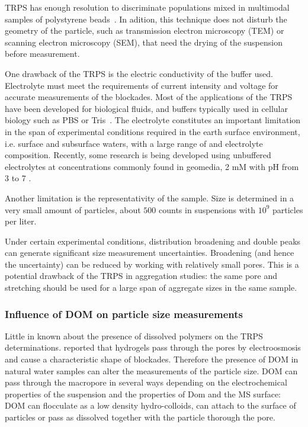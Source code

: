 \documentclass[journal=langd5,manuscript=article]{achemso}
\begin{document}

TRPS has enough resolution to discriminate populations mixed in multimodal samples of polystyrene beads~\cite{Varenne2016MultimodalMethods}.  In adition, this technique does not disturb the geometry of the particle, such as  transmission electron microscopy (TEM) or scanning electron microscopy (SEM), that need the drying of the suspension before measurement.

One drawback of the TRPS is the electric conductivity of the buffer used. Electrolyte must meet the requirements of current intensity and voltage for accurate measurements of the blockades. Most of the applications of the TRPS have been developed for biological fluids, and buffers typically used in cellular biology  such as PBS or Tris~\cite{Lane2015}.
The electrolyte constitutes an important limitation in the span of  experimental conditions required in the  earth surface environment, i.e. surface and subsurface waters, with a large range of  and electrolyte composition. Recently, some research is being developed using unbuffered electrolytes at concentrations commonly found in geomedia, 2 mM  with   pH from  3 to 7 \cite{Mayne2016} .



%
Another limitation is the representativity of the sample. Size is determined in a very small amount of particles, about  $500$ counts in suspensions with $10^9$ particles per liter.



Under certain experimental conditions, distribution broadening and double peaks can generate significant size measurement uncertainties. Broadening (and hence the uncertainty) can be reduced by working with relatively small pores\cite{Weatherall2016}. This is a potential drawback of the TRPS in aggregation studies: the same pore and stretching  should be used for a large span of aggregate sizes in the same sample.

\subsubsection{Influence of DOM on particle size measurements}

Little in known about the presence of dissolved polymers on the TRPS determinations.  \citeauthor{Pevarnik2013}\cite{Pevarnik2013} reported that hydrogels pass through the pores by electroosmosis and cause a characteristic shape of blockades. Therefore the presence of DOM in natural water samples can alter the  measurements of the particle size. DOM can pass through the macropore in several ways depending on the electrochemical properties of the  suspension and the properties of Dom and the MS surface: DOM can flocculate as a low density  hydro-colloids, can attach to the surface of particles or pass as dissolved together with the  particle thorough the pore. 
\end{document}
